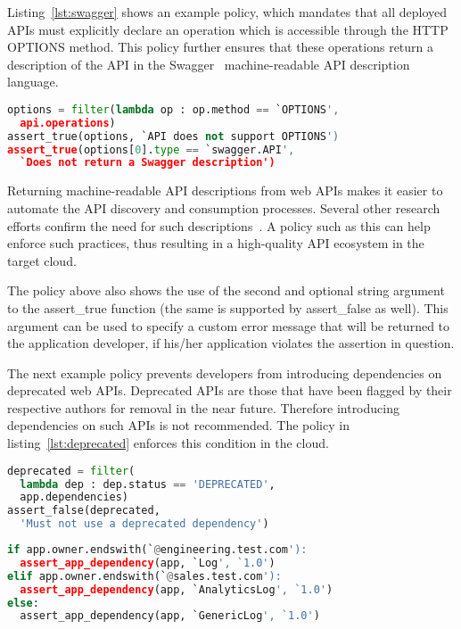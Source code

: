 Listing~\ref{lst:swagger} shows an example policy, which mandates that all deployed APIs must explicitly
declare an operation which is accessible through the HTTP OPTIONS method. This policy further ensures
that these operations return a description of the API in the Swagger~\cite{hl:swagger} machine-readable API
description language.

{\footnotesize
\begin{lstlisting}[language=Python, frame=single, showstringspaces=false, 
caption={Enforcing APIs to publish a description.}, label={lst:swagger}]
options = filter(lambda op : op.method == `OPTIONS',  
  api.operations)
assert_true(options, `API does not support OPTIONS')
assert_true(options[0].type == `swagger.API', 
  `Does not return a Swagger description')
\end{lstlisting}
}

Returning machine-readable API descriptions from web APIs 
makes it easier to automate the API discovery and consumption processes. Several other
research efforts confirm the need for such descriptions~\cite{Verborgh:2012:FDB:2307819.2307828,Steiner:2011:FHC:1967428.1967433}. 
A policy such as this
can help enforce such practices, thus resulting in a high-quality
API ecosystem in the target cloud. 

The policy above also shows the use of the second and
optional string argument to 
the assert\_true function (the same is supported by assert\_false as well). 
This argument can be used to specify
a custom error message that will be returned to the application developer, if his/her application
violates the assertion in question.

The next example policy prevents developers from introducing
dependencies on deprecated web APIs. Deprecated APIs 
are those that have been flagged
by their respective authors for removal 
in the near future. Therefore introducing dependencies on such
APIs is not recommended. The policy in listing~\ref{lst:deprecated} 
enforces this condition in the cloud.

{\footnotesize
\begin{lstlisting}[language=Python, frame=single, showstringspaces=false, 
caption={Preventing dependencies on deprecated APIs.}, label={lst:deprecated}]
deprecated = filter(
  lambda dep : dep.status == 'DEPRECATED', 
  app.dependencies)
assert_false(deprecated, 
  'Must not use a deprecated dependency')
\end{lstlisting}
}

{\footnotesize
\begin{lstlisting}[language=Python, frame=single, showstringspaces=false, 
caption={Tenant-aware policy enforcement.}, label={lst:tenants}]
if app.owner.endswith(`@engineering.test.com'):
  assert_app_dependency(app, `Log', `1.0')
elif app.owner.endswith(`@sales.test.com'):
  assert_app_dependency(app, `AnalyticsLog', `1.0')
else:
  assert_app_dependency(app, `GenericLog', `1.0')
\end{lstlisting}
}

